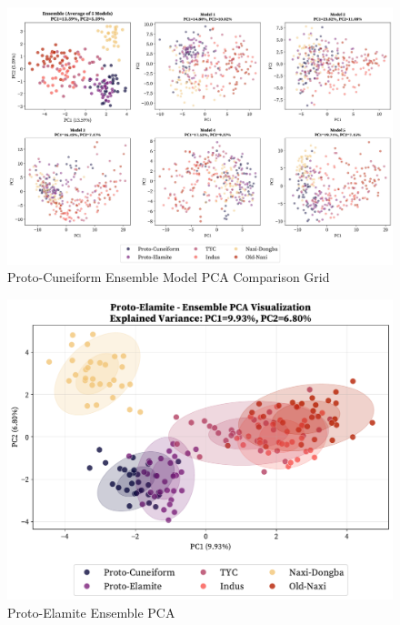 \documentclass[11pt,a4paper,oneside]{report}
\begin{document}
\begin{figure}[H] 
    \centering
    \includegraphics[width=1\linewidth]{Visualizations/PCA/Proto-Cuneiform/model_comparison_grid_pca.pdf}
     \caption*{Proto-Cuneiform Ensemble Model PCA Comparison Grid}
\end{figure}

\begin{figure}[H] 
    \centering
    \includegraphics[width=0.8\linewidth]{Visualizations/PCA/Proto-Elamite/ensemble_pca.pdf}
     \caption*{Proto-Elamite Ensemble PCA}
\end{figure}
\end{document}
